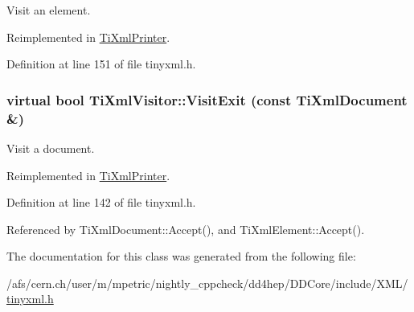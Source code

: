 Visit an element. 

Reimplemented in \hyperlink{class_ti_xml_printer_ae6a1df8271df4bf62d7873c38e34aa69}{TiXmlPrinter}.

Definition at line 151 of file tinyxml.h.\hypertarget{class_ti_xml_visitor_aa0ade4f27087447e93974e975c3246ad}{
\subsubsection[{VisitExit}]{\setlength{\rightskip}{0pt plus 5cm}virtual bool TiXmlVisitor::VisitExit (const {\bf TiXmlDocument} \&)}}
\label{class_ti_xml_visitor_aa0ade4f27087447e93974e975c3246ad}


Visit a document. 

Reimplemented in \hyperlink{class_ti_xml_printer_a0a636046fa589b6d7f3e5bd025b3f33e}{TiXmlPrinter}.

Definition at line 142 of file tinyxml.h.

Referenced by TiXmlDocument::Accept(), and TiXmlElement::Accept().

The documentation for this class was generated from the following file:\begin{DoxyCompactItemize}
\item 
/afs/cern.ch/user/m/mpetric/nightly\_\-cppcheck/dd4hep/DDCore/include/XML/\hyperlink{tinyxml_8h}{tinyxml.h}\end{DoxyCompactItemize}

